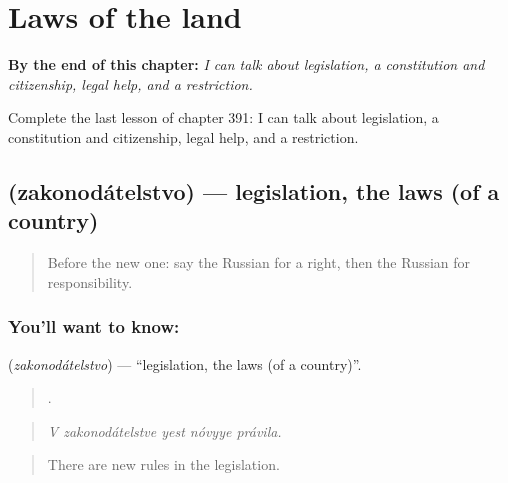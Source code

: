
\chapter{Laws of the land}
\label{ch:ru-laws-of-the-land}

\begin{chapteropening}
\textbf{By the end of this chapter:} \emph{I can talk about legislation, a constitution and citizenship, legal help, and a restriction.}

Complete the last lesson of chapter 391: I can talk about legislation, a constitution and citizenship, legal help, and a restriction.
\end{chapteropening}

\section[\texorpdfstring{\ru{законодательство} (zakonodátelstvo)}{законодательство (zakonodátelstvo)}]{ (zakonodátelstvo) — legislation, the laws (of a country)}

\label{lesson:RU-C391-zakonodatelstvo}



\begin{quote}
Before the new one: say the Russian for a right, then the Russian for responsibility.
\end{quote}

\subsection*{You'll want to know: }
\textbf{} (\emph{zakonodátelstvo}) — \textquotedblleft{}legislation, the laws (of a country)\textquotedblright{}.

\begin{quote}
    .
\end{quote}

\begin{quote}
\emph{V zakonodátelstve yest nóvyye právila.}
\end{quote}

\begin{quote}
There are new rules in the legislation.
\end{quote}

